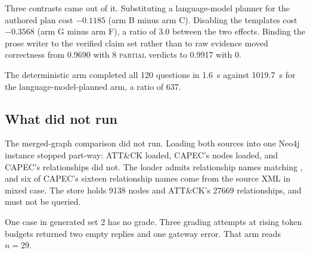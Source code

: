 Three contrasts came out of it. Substituting a language-model planner for the
authored plan cost $-0.1185$ (arm B minus arm C). Disabling the templates cost
$-0.3568$ (arm G minus arm F), a ratio of 3.0 between the two effects. Binding
the prose writer to the verified claim set rather than to raw evidence moved
correctness from 0.9690 with 8 \textsc{partial} verdicts to 0.9917 with 0.

The deterministic arm completed all 120 questions in 1.6~s against 1019.7~s for
the language-model-planned arm, a ratio of 637.

\subsection{What did not run}

The merged-graph comparison did not run. Loading both sources into one Neo4j
instance stopped part-way: ATT\&CK loaded, CAPEC's nodes loaded, and CAPEC's
relationships did not. The loader admits relationship names matching
\pathname{^[A-Z][A-Z0-9_]*$}, and six of CAPEC's sixteen relationship names come
from the source XML in mixed case. The store holds 9138 nodes and ATT\&CK's
27669 relationships, and must not be queried.

One case in generated set 2 has no grade. Three grading attempts at rising token
budgets returned two empty replies and one gateway error. That arm reads
$n = 29$.
